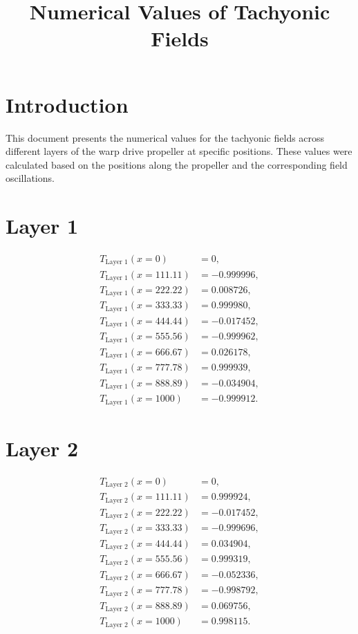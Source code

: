 \documentclass{article}
\title{Numerical Values of Tachyonic Fields}
\author{}
\date{}
\begin{document}
\maketitle

\section*{Introduction}

This document presents the numerical values for the tachyonic fields across different layers of the warp drive propeller at specific positions. These values were calculated based on the positions along the propeller and the corresponding field oscillations.

\section*{Layer 1}
\begin{align*}
T_{\text{Layer 1}}(x = 0) & = 0, \\
T_{\text{Layer 1}}(x = 111.11) & = -0.999996, \\
T_{\text{Layer 1}}(x = 222.22) & = 0.008726, \\
T_{\text{Layer 1}}(x = 333.33) & = 0.999980, \\
T_{\text{Layer 1}}(x = 444.44) & = -0.017452, \\
T_{\text{Layer 1}}(x = 555.56) & = -0.999962, \\
T_{\text{Layer 1}}(x = 666.67) & = 0.026178, \\
T_{\text{Layer 1}}(x = 777.78) & = 0.999939, \\
T_{\text{Layer 1}}(x = 888.89) & = -0.034904, \\
T_{\text{Layer 1}}(x = 1000) & = -0.999912.
\end{align*}

\section*{Layer 2}
\begin{align*}
T_{\text{Layer 2}}(x = 0) & = 0, \\
T_{\text{Layer 2}}(x = 111.11) & = 0.999924, \\
T_{\text{Layer 2}}(x = 222.22) & = -0.017452, \\
T_{\text{Layer 2}}(x = 333.33) & = -0.999696, \\
T_{\text{Layer 2}}(x = 444.44) & = 0.034904, \\
T_{\text{Layer 2}}(x = 555.56) & = 0.999319, \\
T_{\text{Layer 2}}(x = 666.67) & = -0.052336, \\
T_{\text{Layer 2}}(x = 777.78) & = -0.998792, \\
T_{\text{Layer 2}}(x = 888.89) & = 0.069756, \\
T_{\text{Layer 2}}(x = 1000) & = 0.998115.
\end{align*}
\end{document}
